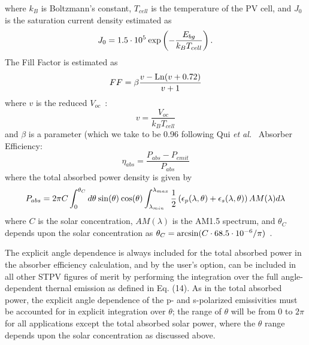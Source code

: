 \documentclass[journal=jpclcd,manuscript=suppinfo]{achemso}
\begin{document}
where $k_B$ is Boltzmann's constant, $T_{cell}$ is the temperature of the PV cell,
and $J_0$ is the saturation current density estimated as~\cite{QHM_Solar_2005, JHR_AdvEnMat_2018}
\begin{equation}
J_0 = 1.5 \cdot 10^5 \: {\rm exp}\left( - \frac{E_{bg}}{k_B T_{cell}} \right).
\end{equation}
The Fill Factor is estimated as~\cite{QHM_Solar_2005, JHR_AdvEnMat_2018} 
\begin{equation}
FF = \beta \frac{v - {\rm Ln}(v + 0.72)}{v+1}
\end{equation}
where $v$ is the reduced $V_{oc}$~\cite{QHM_Solar_2005, JHR_AdvEnMat_2018}:
\begin{equation}
v = \frac{V_{oc}}{k_B T_{cell}}
\end{equation}
and $\beta$ is a parameter (which we take to be 0.96 following Qui {\it et al.}~\cite{QHM_Solar_2005}
\newline
Absorber Efficiency:
\begin{equation}
\eta_{abs} = \frac{P_{abs} - P_{emit}}{P_{abs}}
\end{equation}
where the total absorbed power density is given by~\cite{RF_OptExp_2009}
\begin{equation}
P_{abs} = 2\pi C \int_0^{\theta_C} d\theta \: {\rm sin}(\theta) \: {\rm cos}(\theta) 
\int_{\lambda_{min}}^{\lambda_{max}}\frac{1}{2} \left(\epsilon_p(\lambda, \theta) + \epsilon_s(\lambda, \theta) \right) AM(\lambda) d\lambda
\end{equation}
where $C$ is the solar concentration, $AM(\lambda)$ is the AM1.5 spectrum, and $\theta_C$ depends upon
the solar concentration as $\theta_C = {\rm arcsin}(C \cdot 68.5 \cdot 10^{-6} / \pi)$~\cite{RF_OptExp_2009}.

The explicit angle dependence is always included for the total absorbed power in the absorber efficiency 
calculation, and by the user's option, can be included in all other STPV figures of merit by performing
the integration over the full angle-dependent thernal emission as defined in Eq. (14).  As in the 
total absorbed power, the explicit angle dependence of the p- and s-polarized emissivities must be accounted
for in explicit integration over $\theta$; the range of $\theta$ will be from $0$ to $2\pi$ for all applications
except the total absorbed solar power, where the $\theta$ range depends upon the solar concentration as discussed above.
\end{document}
